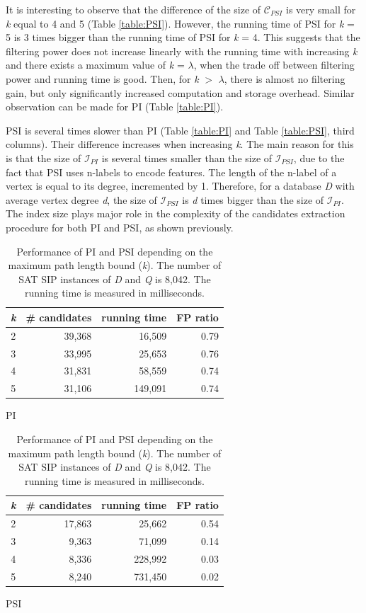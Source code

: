 \documentclass{l4proj}
\newcommand{\fancyI}{\mathcal{I}}
\newcommand{\fancyC}{\mathcal{C}}
\begin{document}
It is interesting to observe that the difference of the size of $\fancyC_{PSI}$ is very small for \emph{k} equal to 4 and 5 (Table \ref{table:PSI}). However, the running time of PSI for \emph{k} = 5 is 3 times bigger than the running time of PSI for \emph{k} = 4. This suggests that the filtering power does not increase linearly with the running time with increasing \emph{k} and there exists a maximum value of \emph{k} = $\lambda$, when the trade off between filtering power and running time is good. Then, for \emph{k} $>$ $\lambda$, there is almost no filtering gain, but only significantly increased computation and storage overhead. Similar observation can be made for PI (Table \ref{table:PI}).

PSI is several times slower than PI (Table \ref{table:PI} and  Table \ref{table:PSI}, third columns). Their difference increases when increasing \emph{k}. The main reason for this is that the size of $\fancyI_{PI}$ is several times smaller than the size of $\fancyI_{PSI}$, due to the fact that PSI uses n-labels to encode features. The length of the n-label of a vertex is equal to its degree, incremented by 1. Therefore, for a database \emph{D} with average vertex degree \emph{d}, the size of $\fancyI_{PSI}$ is \emph{d} times bigger than the size of $\fancyI_{PI}$. The index size plays major role in the complexity of the candidates extraction procedure for both PI and PSI, as shown previously.

\begin{table}
\renewcommand{\arraystretch}{1.2}
\parbox{.45\linewidth}{
\centering
\begin{tabular}{|c|r|r|r|}
\hline
  \emph{k} & \# candidates & running time & FP ratio\\
  \hline
  2 & 39,368 & 16,509 & 0.79 \\
  3 & 33,995 & 25,653 & 0.76 \\
  4 & 31,831 & 58,559 & 0.74 \\
  5 & 31,106 & 149,091 & 0.74 \\
 \hline
\end{tabular}
\caption{PI}\label{table:PI}
}
\parbox{.45\linewidth}{
\centering
\begin{tabular}{ |c|r|r|r|}
\hline
  \emph{k} & \# candidates & running time & FP ratio\\
  \hline
  2 & 17,863 & 25,662 & 0.54 \\
  3 & 9,363  & 71,099 & 0.14 \\
  4 & 8,336  & 228,992 & 0.03 \\
  5 & 8,240  & 731,450 & 0.02 \\
 \hline
\end{tabular}
\caption{PSI}\label{table:PSI}
}
\caption{Performance of PI and PSI depending on the maximum path length bound (\emph{k}). The number of SAT SIP instances of \emph{D} and \emph{Q} is 8,042. The running time is measured in milliseconds.}
\label{table:PIandPSI}
\end{table}
\end{document}
